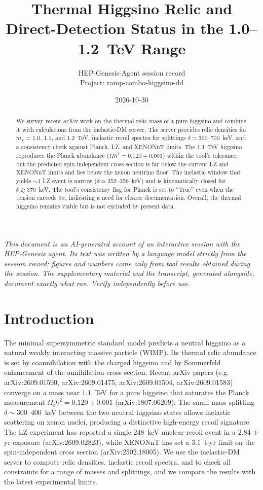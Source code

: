 \documentclass[11pt,a4paper]{article}
\title{Thermal Higgsino Relic and Direct-Detection Status in the 1.0--1.2~TeV Range}
\author{HEP-Genesis-Agent session record \\ \small Project: ramp-combo-higgsino-dd}
\date{2026-10-30}
\begin{document}
\maketitle
\noindent\textit{\small This document is an AI-generated account of an interactive session with the HEP-Genesis agent. Its text was written by a language model strictly from the session record; figures and numbers come only from tool results obtained during the session. The supplementary material and the transcript, generated alongside, document exactly what ran. Verify independently before use.}
\vspace{1em}

\begin{abstract}
We survey recent arXiv work on the thermal relic mass of a pure higgsino and combine it with calculations from the inelastic-DM server.  The server provides relic densities for $m_\chi=1.0$, $1.1$, and $1.2$~TeV, inelastic recoil spectra for splittings $\delta=300$--$700$~keV, and a consistency check against Planck, LZ, and XENONnT limits.  The 1.1~TeV higgsino reproduces the Planck abundance ($\Omega h^2=0.120\pm0.001$) within the tool's tolerance, but the predicted spin-independent cross section is far below the current LZ and XENONnT limits and lies below the xenon neutrino floor.  The inelastic window that yields $\sim1$ LZ event is narrow ($\delta\simeq352$--$356$~keV) and is kinematically closed for $\delta\gtrsim370$~keV.  The tool's consistency flag for Planck is set to ``True'' even when the tension exceeds $9\sigma$, indicating a need for clearer documentation.  Overall, the thermal higgsino remains viable but is not excluded by present data.
\end{abstract}

\section{Introduction}
The minimal supersymmetric standard model predicts a neutral higgsino as a natural weakly interacting massive particle (WIMP).  Its thermal relic abundance is set by coannihilation with the charged higgsino and by Sommerfeld enhancement of the annihilation cross section.  Recent arXiv papers (e.g. arXiv:2609.01590, arXiv:2609.01475, arXiv:2609.01504, arXiv:2609.01583) converge on a mass near $1.1$~TeV for a pure higgsino that saturates the Planck measurement $\Omega_c h^2=0.120\pm0.001$ (arXiv:1807.06209).  The small mass splitting $\delta\sim300$--$400$~keV between the two neutral higgsino states allows inelastic scattering on xenon nuclei, producing a distinctive high-energy recoil signature.  The LZ experiment has reported a single $248$~keV nuclear-recoil event in a $2.84$~t-yr exposure (arXiv:2609.02823), while XENONnT has set a $3.1$~t-yr limit on the spin-independent cross section (arXiv:2502.18005).  We use the inelastic-DM server to compute relic densities, inelastic recoil spectra, and to check all constraints for a range of masses and splittings, and we compare the results with the latest experimental limits.
\end{document}
